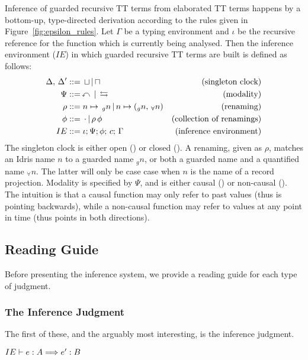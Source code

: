 
Inference of guarded recursive TT terms from elaborated TT terms happens by a
bottom-up, type-directed derivation according to the rules given in
Figure~\ref{fig:epsilon_rules}. Let $\Gamma$ be a typing environment and $\iota$ be the recursive
reference for the function which is currently being analysed. Then the inference
environment ($IE$) in which guarded recursive TT terms are built is defined as follows:
\begin{align*}
   \Delta,\,\Delta^\prime &::=\,\sqcup\,|\,\sqcap & \text{(singleton clock)} \\
   \Psi &::=\,\curvearrowleft\,|\,\leftrightarrows & \text{(modality)} \\
   \rho &::= n \mapsto \,_gn\,|\,n \mapsto (_gn,\, _{\forall}n) & \text{(renaming)} \\
   \phi &::=\,\cdot\,|\,\rho\,\phi & \text{(collection of renamings)} \\
   IE &::= \iota;\Psi;\phi;\,c;\,\Gamma & \text{(inference environment)}
\end{align*}
The singleton clock is either open (\open) or closed (\closed). A renaming, given as $\rho$, matches an Idris name $n$ to a
guarded name $_gn$, or both a guarded name and a quantified name
$_{\forall}n$. The latter will only be case case when $n$ is the name of a
record projection. Modality is specified by $\Psi$, and
is either causal (\causal) or non-causal (\noncausal). The intuition is that
a causal function may only refer to past values (thus \causal{} is pointing
backwards), while a non-causal function may refer to values at any point in time (thus
\noncausal{} points in both directions).

\subsection{Reading Guide}
Before presenting the inference system, we provide a reading guide for each type
of judgment. 

\subsubsection{The Inference Judgment}
The first of these, and the arguably most interesting, is the inference judgment.

\begin{center}
  ${IE\vdash e : A \Longrightarrow e' : B}$
\end{center}

